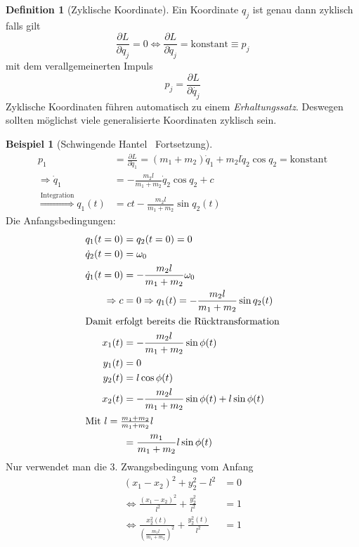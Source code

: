 \documentclass[oneside]{book}
\theoremstyle{definition}
\newtheorem*{definition*}{Definition}
\newtheorem*{beispiel*}{Beispiel}
\newcommand{\ffpartial}[2]{\frac{\partial #1}{\partial #2}}
\newcommand{\const}{\text{konstant}}
\begin{document}
\begin{definition*}[Zyklische Koordinate]\label{zyklische_koordinate}
	Ein Koordinate $q_j$ ist genau dann zyklisch falls gilt
	$$\ffpartial{L}{q_j} = 0 \Leftrightarrow \ffpartial{L}{\dot{q}_j} = \text{konstant} \equiv p_j$$
	mit dem verallgemeinerten Impuls 
	$$p_j = \ffpartial{L}{\dot{q_j}}$$
	Zyklische Koordinaten führen automatisch zu einem \textit{Erhaltungssatz}. Deswegen sollten möglichst viele generalisierte Koordinaten zyklisch sein.
\end{definition*}

\begin{beispiel*}[Schwingende Hantel \textendash~Fortsetzung]
	\begin{align*}
		p_1 &= \ffpartial{L}{\dot{q}_1} = (m_1 + m_2)\dot{q}_1 + m_2 l \dot{q}_2 \cos q_2 = \const\\
		\Rightarrow \dot{q}_1 &= - \frac{m_2 l}{m_1 + m_2} \dot{q}_2 \cos q_2 + c\\
		\overset{\text{Integration}}{\Rightarrow} q_1(t) &= ct - \frac{m_2 l}{m_1 + m_2} \sin q_2(t)
	\end{align*}
	Die Anfangsbedingungen:
	\begin{align*}
		q_1(t = 0) &= q_2(t = 0) = 0\\
		\dot{q}_2(t=0) &= \omega_0\\
		\dot{q}_1(t=0) &= - \frac{m_2 l}{m_1 + m_2} \omega_0\\
		\Rightarrow c &= 0 \Rightarrow q_1(t) = - \frac{m_2 l}{m_1 + m_2} \sin q_2(t)\\
		\intertext{Damit erfolgt bereits die Rücktransformation}
	x_1(t) &= - \frac{m_2 l}{m_1 + m_2} \sin \phi(t)\\
	y_1(t) &= 0\\
	y_2(t) &= l \cos \phi(t)\\
	x_2(t) &= - \frac{m_2 l}{m_1 + m_2} \sin \phi(t) + l \sin \phi(t)\\ 
	\intertext{Mit $l = \frac{m_1 + m_2}{m_1 + m_2} l$}
	&= \frac{m_1}{m_1 + m_2} l \sin \phi(t)\\
	\end{align*}
	Nur verwendet man die 3. Zwangsbedingung vom Anfang
	\begin{align*}
	(x_1 - x_2)^2 + y_2^2 - l^2 &= 0\\
	\Leftrightarrow \frac{(x_1 - x_2)^2}{l^2} + \frac{y_2^2}{l^2} &= 1\\ 
	\Leftrightarrow \frac{x_2^2(t)}{(\frac{m_1 l}{m_1 + m_2})^2} + \frac{y_2^2(t)}{l^2} &= 1
	\end{align*}

\end{beispiel*}
\end{document}
